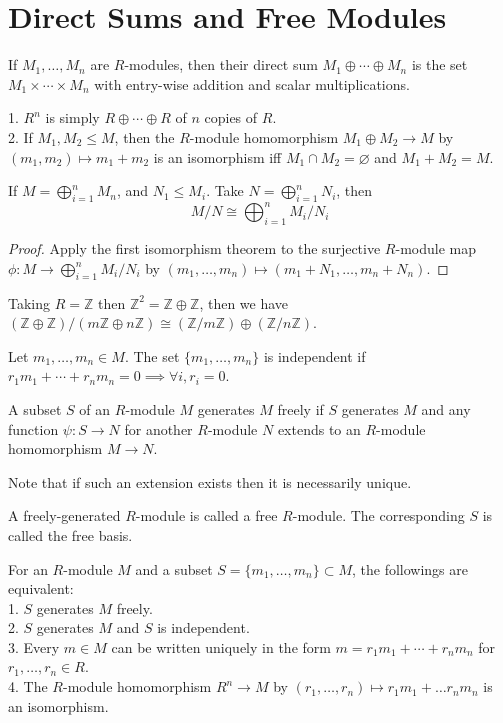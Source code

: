 \section{Direct Sums and Free Modules}
\begin{definition}
    If $M_1,\ldots,M_n$ are $R$-modules, then their direct sum $M_1\oplus\cdots\oplus M_n$ is the set $M_1\times \cdots\times M_n$ with entry-wise addition and scalar multiplications.
\end{definition}
\begin{example}
    1. $R^n$ is simply $R\oplus\cdots\oplus R$ of $n$ copies of $R$.\\
    2. If $M_1,M_2\le M$, then the $R$-module homomorphism $M_1\oplus M_2\to M$ by $(m_1,m_2)\mapsto m_1+m_2$ is an isomorphism iff $M_1\cap M_2=\varnothing$ and $M_1+M_2=M$.
\end{example}
\begin{lemma}
    If $M=\bigoplus_{i=1}^nM_n$, and $N_1\le M_i$.
    Take $N=\bigoplus_{i=1}^nN_i$, then
    $$M/N\cong\bigoplus_{i=1}^nM_i/N_i$$
\end{lemma}
\begin{proof}
    Apply the first isomorphism theorem to the surjective $R$-module map $\phi:M\to\bigoplus_{i=1}^nM_i/N_i$ by $(m_1,\ldots,m_n)\mapsto(m_1+N_1,\ldots,m_n+N_n)$.
\end{proof}
\begin{example}
    Taking $R=\mathbb Z$ then $\mathbb Z^2=\mathbb Z\oplus \mathbb Z$, then we have $(\mathbb Z\oplus\mathbb Z)/(m\mathbb Z\oplus n\mathbb Z)\cong(\mathbb Z/m\mathbb Z)\oplus(\mathbb Z/n\mathbb Z)$.
\end{example}
\begin{definition}
    Let $m_1,\ldots,m_n\in M$.
    The set $\{m_1,\ldots,m_n\}$ is independent if $r_1m_1+\cdots +r_nm_n=0\implies \forall i,r_i=0$.
\end{definition}
\begin{definition}
    A subset $S$ of an $R$-module $M$ generates $M$ freely if $S$ generates $M$ and any function $\psi:S\to N$ for another $R$-module $N$ extends to an $R$-module homomorphism $M\to N$.
\end{definition}
Note that if such an extension exists then it is necessarily unique.
\begin{definition}
    A freely-generated $R$-module is called a free $R$-module.
    The corresponding $S$ is called the free basis.
\end{definition}
\begin{proposition}
    For an $R$-module $M$ and a subset $S=\{m_1,\ldots,m_n\}\subset M$, the followings are equivalent:\\
    1. $S$ generates $M$ freely.\\
    2. $S$ generates $M$ and $S$ is independent.\\
    3. Every $m\in M$ can be written uniquely in the form $m=r_1m_1+\cdots +r_nm_n$ for $r_1,\ldots,r_n\in R$.\\
    4. The $R$-module homomorphism $R^n\to M$ by $(r_1,\ldots,r_n)\mapsto r_1m_1+\ldots r_nm_n$ is an isomorphism.
\end{proposition}
